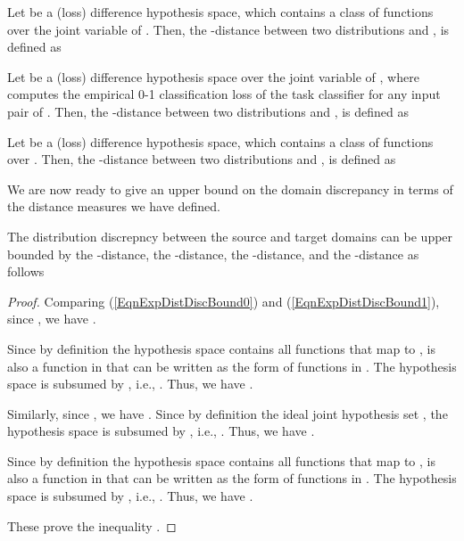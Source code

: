 \documentclass[letterpaper]{article} \usepackage{aaai20}  \usepackage{times}  \usepackage{helvet} \usepackage{courier}  \usepackage[hyphens]{url}  \usepackage{graphicx} \urlstyle{rm} \def\UrlFont{\rm}  \usepackage{graphicx}  \frenchspacing  \setlength{\pdfpagewidth}{8.5in}  \setlength{\pdfpageheight}{11in}
\begin{document}
\begin{definition}
	Let  be a (loss) difference hypothesis space, which contains a class of functions  over the joint variable of . Then, the -distance between two distributions  and , is defined as 
	
\end{definition}

\begin{definition}
	Let  be a (loss) difference hypothesis space over the joint variable of , where  computes the empirical 0-1 classification loss of the task classifier  for any input pair of . Then, the -distance between two distributions  and , is defined as 
	
\end{definition}

\begin{definition}
	Let  be a (loss) difference hypothesis space, which contains a class of functions  over . Then, the -distance between two distributions  and , is defined as 
	
\end{definition}

We are now ready to give an upper bound on the domain discrepancy in terms of the distance measures we have defined.

\begin{theorem}
	\label{tighterBound}
	The distribution discrepncy between the source and target domains  can be upper bounded by the -distance, the -distance, the -distance, and the -distance as follows 
	
\end{theorem}

\begin{proof}
	Comparing (\ref{EqnExpDistDiscBound0}) and (\ref{EqnExpDistDiscBound1}), since , we have .
	
	Since by definition the hypothesis space  contains all functions that map  to ,  is also a function in  that can be written as the form of functions in . The hypothesis space  is subsumed by  , i.e., . Thus, we have .
	
	Similarly, since , we have . Since by definition the ideal joint hypothesis set , the hypothesis space  is subsumed by , i.e., . Thus, we have . 
	
	Since by definition the hypothesis space  contains all functions that map  to ,  is also a function in  that can be written as the form of functions in . The hypothesis space  is subsumed by , i.e., . Thus, we have .
	
	These prove the inequality .
\end{proof}
\end{document}
